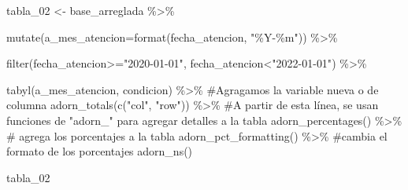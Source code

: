 \documentclass[
  letterpaper,
  DIV=11,
  numbers=noendperiod]{scrreprt}
\newenvironment{Shaded}{\begin{snugshade}}{\end{snugshade}}
\newcommand{\AttributeTok}[1]{\textcolor[rgb]{0.40,0.45,0.13}{#1}}
\newcommand{\CommentTok}[1]{\textcolor[rgb]{0.37,0.37,0.37}{#1}}
\newcommand{\FunctionTok}[1]{\textcolor[rgb]{0.28,0.35,0.67}{#1}}
\newcommand{\NormalTok}[1]{\textcolor[rgb]{0.00,0.23,0.31}{#1}}
\newcommand{\OtherTok}[1]{\textcolor[rgb]{0.00,0.23,0.31}{#1}}
\newcommand{\SpecialCharTok}[1]{\textcolor[rgb]{0.37,0.37,0.37}{#1}}
\newcommand{\StringTok}[1]{\textcolor[rgb]{0.13,0.47,0.30}{#1}}
\begin{document}
\begin{Shaded}
\begin{Highlighting}[]
\NormalTok{tabla\_02 }\OtherTok{\textless{}{-}}\NormalTok{ base\_arreglada }\SpecialCharTok{\%\textgreater{}\%} 
  
  \FunctionTok{mutate}\NormalTok{(}\AttributeTok{a\_mes\_atencion=}\FunctionTok{format}\NormalTok{(fecha\_atencion, }\StringTok{"\%Y{-}\%m"}\NormalTok{)) }\SpecialCharTok{\%\textgreater{}\%} 
 
   \FunctionTok{filter}\NormalTok{(fecha\_atencion}\SpecialCharTok{\textgreater{}=}\StringTok{"2020{-}01{-}01"}\NormalTok{, fecha\_atencion}\SpecialCharTok{\textless{}}\StringTok{"2022{-}01{-}01"}\NormalTok{) }\SpecialCharTok{\%\textgreater{}\%} 
  
  \FunctionTok{tabyl}\NormalTok{(a\_mes\_atencion,}
\NormalTok{        condicion)  }\SpecialCharTok{\%\textgreater{}\%}  \CommentTok{\#Agragamos la variable nueva o de columna}
  \FunctionTok{adorn\_totals}\NormalTok{(}\FunctionTok{c}\NormalTok{(}\StringTok{"col"}\NormalTok{, }\StringTok{"row"}\NormalTok{)) }\SpecialCharTok{\%\textgreater{}\%} \CommentTok{\#A partir de esta línea, se usan funciones de "adorn\_" para agregar detalles a la tabla}
  \FunctionTok{adorn\_percentages}\NormalTok{() }\SpecialCharTok{\%\textgreater{}\%} \CommentTok{\# agrega los porcentajes a la tabla}
  \FunctionTok{adorn\_pct\_formatting}\NormalTok{() }\SpecialCharTok{\%\textgreater{}\%}  \CommentTok{\#cambia el formato de los porcentajes}
  \FunctionTok{adorn\_ns}\NormalTok{() }

\NormalTok{tabla\_02}
\end{Highlighting}
\end{Shaded}
\end{document}
